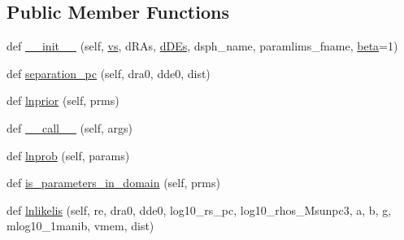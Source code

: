 \subsection*{Public Member Functions}
\begin{DoxyCompactItemize}
\item 
def \hyperlink{classmodki17_1_1modKI17__memonly_a130f863b48dea1c6555c206233f6ba40}{\+\_\+\+\_\+init\+\_\+\+\_\+} (self, \hyperlink{classmodki17_1_1modKI17__memonly_a20e35678f46a3680074c9825fbee1827}{vs}, d\+R\+As, \hyperlink{classmodki17_1_1modKI17__memonly_aae460091f1bf62d4cf6bd2a4af2ff4dd}{d\+D\+Es}, dsph\+\_\+name, paramlims\+\_\+fname, \hyperlink{classmodki17_1_1modKI17__memonly_a193da8b47599eb4a1c60ae080d7475c1}{beta}=1)
\item 
def \hyperlink{classmodki17_1_1modKI17__memonly_ae46bea8dc18dc3d68cd1fe560da8eee8}{separation\+\_\+pc} (self, dra0, dde0, dist)
\item 
def \hyperlink{classmodki17_1_1modKI17__memonly_abb74996f02269af842ee9a12f8054635}{lnprior} (self, prms)
\item 
def \hyperlink{classmodki17_1_1modKI17__memonly_a9c3df4e62b2a34f1bde0835d75c4afdf}{\+\_\+\+\_\+call\+\_\+\+\_\+} (self, args)
\item 
def \hyperlink{classmodki17_1_1modKI17__memonly_a5eb9873dae68be85438e7014425d69a0}{lnprob} (self, params)
\item 
def \hyperlink{classmodki17_1_1modKI17__memonly_a32029497de5993152e902e6cee8554c9}{is\+\_\+parameters\+\_\+in\+\_\+domain} (self, prms)
\item 
def \hyperlink{classmodki17_1_1modKI17__memonly_acd5664cdd71217fd6cdd195907ba79a1}{lnlikelis} (self, re, dra0, dde0, log10\+\_\+rs\+\_\+pc, log10\+\_\+rhos\+\_\+\+Msunpc3, a, b, g, mlog10\+\_\+1manib, vmem, dist)
\end{DoxyCompactItemize}
